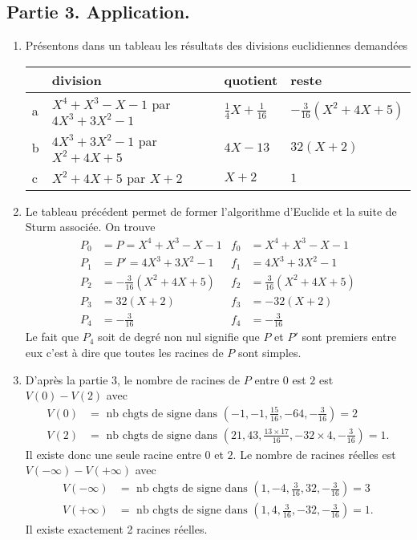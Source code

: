 \subsection*{Partie 3. Application.}
\begin{enumerate}
  \item Présentons dans un tableau les résultats des divisions euclidiennes demandées
\begin{center}
\renewcommand{\arraystretch}{1.8}
\begin{tabular}{|l|l|l|l|} \hline
 & division & quotient & reste \\ \hline
a & $X^4 + X ^3 - X - 1$ par $4X^3 + 3X^2 -1$ & $\frac{1}{4}X + \frac{1}{16}$ & $-\frac{3}{16}(X^2 + 4X +5)$ \\ \hline
b & $4X^3 + 3X^2 -1$ par $X^2 + 4X +5$        & $4X - 13$ & $32(X + 2)$ \\ \hline
c & $X^2 + 4X +5$ par $X + 2$                 & $X + 2$ & $1$ \\ \hline
\end{tabular}
\end{center}

  \item Le tableau précédent permet de former l'algorithme d'Euclide et la suite de Sturm associée. On trouve
\[
  \begin{aligned}
    P_0 &= P = X^4 + X ^3 - X - 1     & f_0 &= X^4 + X ^3 - X - 1\\
    P_1 &= P' = 4X^3 + 3X^2 -1        & f_1 &= 4X^3 + 3X^2 -1\\
    P_2 &= -\frac{3}{16}(X^2 + 4X +5) & f_2 &= \frac{3}{16}(X^2 + 4X +5)\\
    P_3 &= 32(X + 2)                  & f_3 &= -32(X + 2) \\
    P_4 &= -\frac{3}{16}              & f_4 &= -\frac{3}{16}
  \end{aligned}
\]
Le fait que $P_4$ soit de degré non nul signifie que $P$ et $P'$ sont premiers entre eux c'est à dire que toutes les racines de $P$ sont simples.

  \item D'après la partie 3, le nombre de racines de $P$ entre $0$ est $2$ est $V(0) - V(2)$ avec 
\[
  \begin{aligned}
    V(0) &= \text{ nb chgts de signe dans } \left( -1, -1, \frac{15}{16}, -64, -\frac{3}{16}\right) = 2\\
    V(2) &= \text{ nb chgts de signe dans } \left( 21, 43, \frac{13\times 17}{16}, -32\times 4, -\frac{3}{16}\right) = 1.
  \end{aligned}
\]
Il existe donc une seule racine entre $0$ et $2$.\newline
Le nombre de racines réelles est $V(-\infty) - V(+\infty)$ avec
\[
  \begin{aligned}
    V(-\infty) &= \text{ nb chgts de signe dans } \left( 1, -4, \frac{3}{16}, 32, -\frac{3}{16}\right) = 3\\
    V(+\infty) &= \text{ nb chgts de signe dans } \left( 1, 4, \frac{3}{16}, -32, -\frac{3}{16}\right) = 1.
  \end{aligned}
\]
Il existe exactement 2 racines réelles.


\end{enumerate}
